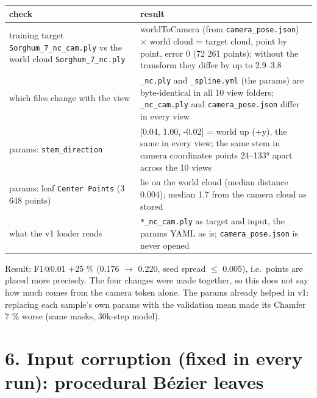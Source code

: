 \documentclass[
  10pt,
]{article}
\newcounter{none} %
\begin{document}
{\def\LTcaptype{none} %
\begin{longtable}[]{@{}
  >{\raggedright\arraybackslash}p{}
  >{\raggedright\arraybackslash}p{}@{}}
\toprule\noalign{}
\begin{minipage}[b]{\linewidth}\raggedright
check
\end{minipage} & \begin{minipage}[b]{\linewidth}\raggedright
result
\end{minipage} \\
\midrule\noalign{}
\endhead
\bottomrule\noalign{}
\endlastfoot
training target \texttt{Sorghum\_7\_nc\_cam.ply} vs the world cloud
\texttt{Sorghum\_7\_nc.ply} & worldToCamera (from
\texttt{camera\_pose.json}) \(\times\) world cloud = target cloud, point
by point, error 0 (72 261 points); without the transform they differ by
up to 2.9--3.8 \\
which files change with the view & \texttt{\_nc.ply} and
\texttt{\_spline.yml} (the params) are byte-identical in all 10 view
folders; \texttt{\_nc\_cam.ply} and \texttt{camera\_pose.json} differ in
every view \\
params: \texttt{stem\_direction} & {[}0.04, 1.00, -0.02{]} = world up
(+y), the same in every view; the same stem in camera coordinates points
24--133° apart across the 10 views \\
params: leaf \texttt{Center\ Points} (3 648 points) & lie on the world
cloud (median distance 0.004); median 1.7 from the camera cloud as
stored \\
what the v1 loader reads & \texttt{*\_nc\_cam.ply} as target and input,
the params YAML as is; \texttt{camera\_pose.json} is never opened \\
\end{longtable}
}

Result: F1@0.01 +25 \% (0.176 \(\to\) 0.220, seed spread \(\leq\)
0.005), i.e.~points are placed more precisely. The four changes were
made together, so this does not say how much comes from the camera token
alone. The params already helped in v1: replacing each sample's own
params with the validation mean made its Chamfer 7 \% worse (same masks,
30k-step model).

\newpage

\section{6. Input corruption (fixed in every run): procedural Bézier
leaves}\label{input-corruption-fixed-in-every-run-procedural-buxe9zier-leaves}
\end{document}
